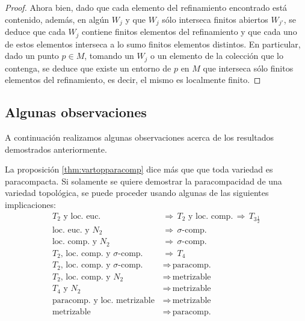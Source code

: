 \begin{proof}
	Ahora bien, dado que cada elemento del refinamiento encontrado
	est\'{a} contenido, adem\'{a}s, en alg\'{u}n $W_{j}$ y que $W_{j}$
	s\'{o}lo interseca finitos abiertos $W_{j'}$, se deduce que cada
	$W_{j}$ contiene finitos elementos del refinamiento y que cada uno
	de estos elementos interseca a lo sumo finitos elementos distintos.
	En particular, dado un punto $p\in M$, tomando un $W_{j}$ o un
	elemento de la colecci\'{o}n que lo contenga, se deduce que existe
	un entorno de $p$ en $M$ que interseca s\'{o}lo finitos elementos
	del refinamiento, es decir, el mismo es localmente finito.
\end{proof}

\subsection{Algunas observaciones}
A continuaci\'{o}n realizamos algunas observaciones acerca de los resultados
demostrados anteriormente.

\begin{remarkVarTopParacomp}
	La proposici\'{o}n \ref{thm:vartopparacomp} dice m\'{a}s que que
	toda variedad es paracompacta. Si solamente se quiere demostrar
	la paracompacidad de una variedad topol\'{o}gica, se puede proceder
	usando algunas de las siguientes implicaciones:
	\begin{align*}
		\text{$T_{2}$ y loc. euc.} & \,\Rightarrow\,
			\text{$T_{2}$ y loc. comp.}\,\Rightarrow\,
			\text{$T_{3\frac{1}{2}}$}\\
		\text{loc. euc. y $N_{2}$} & \,\Rightarrow\,
			\text{$\sigma$-comp.} \\
		\text{loc. comp. y $N_{2}$} & \,\Rightarrow\,
			\text{$\sigma$-comp.} \\
		\text{$T_{2}$, loc. comp. y $\sigma$-comp.} & \,\Rightarrow\,
			\text{$T_{4}$} \\
		\text{$T_{2}$, loc. comp. y $\sigma$-comp.} & \,\Rightarrow\,
			\text{paracomp.} \\
		\text{$T_{2}$, loc. comp. y $N_{2}$} & \,\Rightarrow\,
			\text{metrizable} \\
		\text{$T_{4}$ y $N_{2}$} & \,\Rightarrow\,
			\text{metrizable} \\
		\text{paracomp. y loc. metrizable} & \,\Rightarrow\,
			\text{metrizable} \\
		\text{metrizable} & \,\Rightarrow\,\text{paracomp.}
	\end{align*}
\end{remarkVarTopParacomp}

